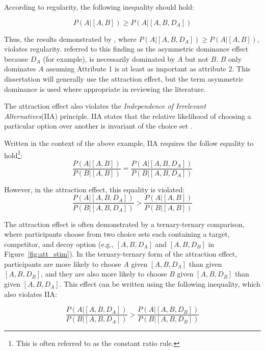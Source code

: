 According to regularity, the following inequality should hold:

\begin{equation}
  P(A|[A,B])\geq P(A|[A,B,D_{A}])
  \label{eqn:reg_att}
\end{equation}

Thus, the results demonstrated by \textcite{huberAddingAsymmetricallyDominated1982d}, where $P(A|[A,B,D_{A}])\geq P(A|[A,B])$, violates regularity. \textcite{huberAddingAsymmetricallyDominated1982d} referred to this finding as the asymmetric dominance effect because $D_{A}$ (for example), is necessarily dominated by $A$ but not $B$. $B$ only dominates $A$ assuming Attribute 1 is at least as important as attribute 2. This dissertation will generally use the attraction effect, but the term asymmetric dominance is used where appropriate in reviewing the literature.

The attraction effect also violates the \textit{Independence of Irrelevant Alternatives}(IIA) principle. IIA states that the relative likelihood of choosing a particular option over another is invariant of the choice set \parencite{ray1973independence}. 

Written in the context of the above example, IIA requires the follow equality to hold\footnote{This is often referred to as the constant ratio rule.}: 
\begin{equation}
  \frac{P(A|[A,B])}{P(B|[A,B])}=\frac{P(A|[A,B,D_{A}])}{P(B|[A,B,D_{A}])}
  \label{eqn:iia_att}
\end{equation}

However, in the attraction effect, this equality is violated:
\begin{equation}
  \frac{P(A|[A,B,D_{A}])}{P(B|[A,B,D_{A}])}>\frac{P(A|[A,B])}{P(B|[A,B])}
  \label{eqn:iia_att1}
\end{equation}

The attraction effect is often demonstrated by a ternary-ternary comparison, where participants choose from two choice sets each containing a target, competitor, and decoy option (e.g., $[A,B,D_{A}]$ and  $[A,B,D_{B}]$ in Figure~\ref{fig:att_stim}). In the ternary-ternary form of the attraction effect, participants are more likely to choose $A$ given $[A,B,D_{A}]$ than given $[A,B,D_{B}]$, and they are also more likely to choose $B$ given $[A,B,D_{B}]$ than given $[A,B,D_{A}]$. This effect can be written using the following inequality, which also violates IIA:

\begin{equation}
  \frac{P(A|[A,B,D_{A}])}{P(B|[A,B,D_{A}])}>\frac{P(A|[A,B,D_{B}])}{P(B|[A,B,D_{B}])}
  \label{eqn:iia_att2}
\end{equation}

